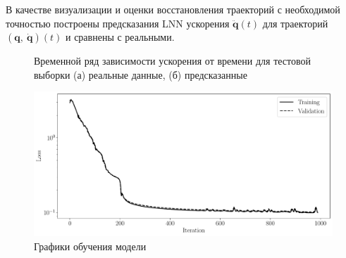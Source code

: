 \documentclass[12pt, twoside]{article}
\begin{document}
В качестве визуализации и оценки восстановления траекторий с необходимой точностью построены предсказания LNN ускорения $\ddot{\mathbf{q}}(t)$ для траекторий $(\mathbf{q},\ \mathbf{\dot{q}})(t)$ и сравнены с реальными.

\begin{figure}[H]
 \centering
 
 \caption{Временной ряд зависимости ускорения от времени для тестовой выборки (а) реальные данные, (б) предсказанные}
 \label{fig: trajectory}
\end{figure}

\begin{figure}[H]
 \centering
 \includegraphics[scale = 0.42]{experiment4_1000.pickle_loss.pdf}
 \caption{Графики обучения модели}
 \label{fig: learning_rate}
\end{figure}
\end{document}
